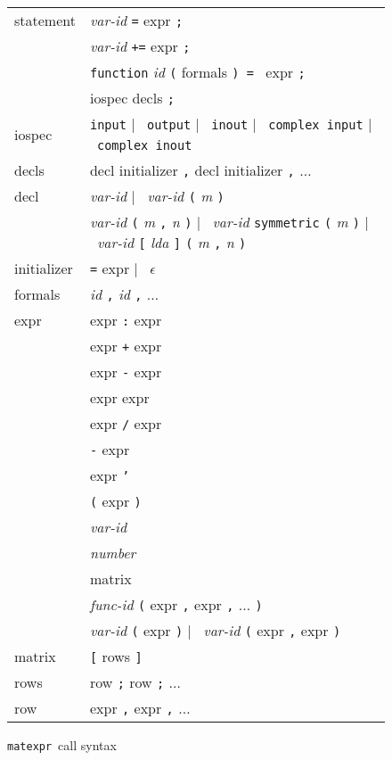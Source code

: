 \documentclass[12pt]{article}
\newcommand{\matexpr}{\texttt{matexpr}}
\newcommand{\gOR}{ $|$ }
\begin{document}
\begin{figure}
\begin{center}
\begin{tabular}{l@{ := }l}
  statement & {\it var-id} {\tt =}  expr {\tt ;} \\
            & {\it var-id} {\tt +=} expr {\tt ;} \\
            & {\tt function} {\it id} {\tt (} formals {\tt ) = } expr {\tt ;} \\
            & iospec decls {\tt ;}
\vspace{5mm} \\
  iospec    & {\tt input} \gOR\ {\tt output} \gOR\ {\tt inout} \gOR\
              {\tt complex input} \gOR\ {\tt complex inout} \\
  decls     & decl initializer {\tt ,} decl initializer {\tt ,} $\ldots$ \\
  decl      & {\it var-id} \gOR\ 
              {\it var-id} {\tt (} {\it m} {\tt )} \\
            & {\it var-id} {\tt (} {\it m} {\tt ,} {\it n} {\tt )} \gOR\
              {\it var-id} {\tt symmetric} {\tt (} {\it m} {\tt )} \gOR\
              {\it var-id} {\tt [} {\it lda} {\tt ]} 
                           {\tt (} {\it m} {\tt ,} {\it n} {\tt )} \\
  initializer & {\tt =} expr \gOR\ $\epsilon$ \\
  formals & {\it id} {\tt ,} {\it id} {\tt ,} $\ldots$ 
\vspace{5mm} \\
  expr & expr {\tt :} expr \\
       & expr {\tt +} expr \\
       & expr {\tt -} expr \\
       & expr {\tt *} expr \\
       & expr {\tt /} expr \\
       & {\tt -} expr \\
       & expr {\tt '} \\
       & {\tt (} expr {\tt )} \\
       & {\it var-id} \\
       & {\it number} \\
       & matrix \\
       & {\it func-id} {\tt (} expr {\tt ,} expr {\tt ,} $\ldots$ {\tt )} \\
       & {\it var-id} {\tt (} expr {\tt )} \gOR\ 
         {\it var-id} {\tt (} expr {\tt ,} expr {\tt )} \\
  matrix  & {\tt [} rows {\tt ]} \\
  rows    & row {\tt ;} row {\tt ;} $\ldots$ \\
  row     & expr {\tt ,} expr {\tt ,} $\ldots$
\end{tabular}
\caption{\matexpr\ call syntax}
\label{matexpr-syntax-fig}
\end{center}
\end{figure}
\end{document}
